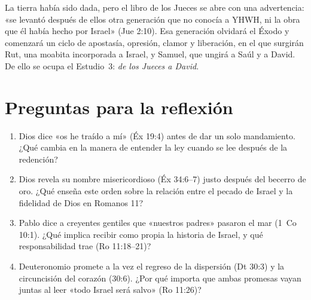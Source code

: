 \documentclass[11pt,letterpaper]{article}
\begin{document}
La tierra había sido dada, pero el libro de los Jueces se abre con una advertencia: «se levantó después de ellos otra generación que no conocía a YHWH, ni la obra que él había hecho por Israel» (Jue 2:10). Esa generación olvidará el Éxodo y comenzará un ciclo de apostasía, opresión, clamor y liberación, en el que surgirán Rut, una moabita incorporada a Israel, y Samuel, que ungirá a Saúl y a David. De ello se ocupa el Estudio~3: \emph{de los Jueces a David}.

\section*{Preguntas para la reflexión}
\begin{enumerate}
\item Dios dice «os he traído a mí» (Éx 19:4) antes de dar un solo mandamiento. ¿Qué cambia en la manera de entender la ley cuando se lee después de la redención?
\item Dios revela su nombre misericordioso (Éx 34:6–7) justo después del becerro de oro. ¿Qué enseña este orden sobre la relación entre el pecado de Israel y la fidelidad de Dios en Romanos 11?
\item Pablo dice a creyentes gentiles que «nuestros padres» pasaron el mar (1~Co 10:1). ¿Qué implica recibir como propia la historia de Israel, y qué responsabilidad trae (Ro 11:18–21)?
\item Deuteronomio promete a la vez el regreso de la dispersión (Dt 30:3) y la circuncisión del corazón (30:6). ¿Por qué importa que ambas promesas vayan juntas al leer «todo Israel será salvo» (Ro 11:26)?
\end{enumerate}
\end{document}
